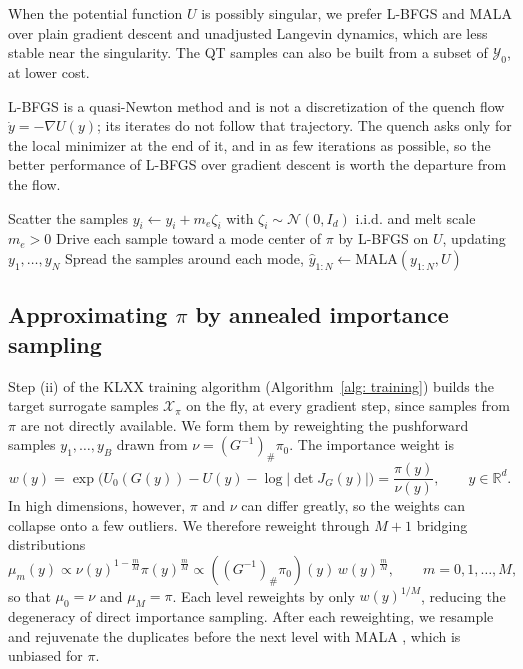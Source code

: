 \documentclass{article}
\begin{document}
When the potential function $U$ is possibly singular, we prefer L-BFGS and MALA over plain gradient descent and unadjusted Langevin dynamics, which are less stable near the singularity. The QT samples can also be built from a subset of $\mathcal Y_0$, at lower cost.

\begin{remark}
	{\color{blue}L-BFGS is a quasi-Newton method \citep{liu1989limited} and is not a discretization of the quench flow $\dot y = -\nabla U(y)$; its iterates do not follow that trajectory. The quench asks only for the local minimizer at the end of it, and in as few iterations as possible, so the better performance of L-BFGS over gradient descent is worth the departure from the flow.}
\end{remark}

\begin{algorithm}[htb]
\caption{Quench and temper (QT): wide-coverage construction}
\label{alg: QT}
Scatter the samples $y_i \gets y_i + m_e\zeta_i$ with $\zeta_i \sim \mathcal N(0, I_d)$ i.i.d. and melt scale $m_e > 0$\;
Drive each sample toward a mode center of $\pi$ by L-BFGS on $U$, updating $y_1,\dots,y_N$\;
Spread the samples around each mode, $\hat y_{1:N} \gets \mathrm{MALA}(y_{1:N}, U)$\;
\end{algorithm}

\subsection{Approximating $\pi$ by annealed importance sampling}
\label{subsec: annealing}

Step (ii) of the KLXX training algorithm (Algorithm~\ref{alg: training}) builds the target surrogate samples $\mathcal X_{\pi}$ on the fly, at every gradient step, since samples from $\pi$ are not directly available. We form them by reweighting the pushforward samples $y_1,\dots,y_B$ drawn from $\nu=(G^{-1})_{\#}\pi_0$. The importance weight is
\begin{equation}
	w(y)
	= \exp\Big( U_0(G(y)) - U(y) - \log|\det J_G(y)| \Big)
	= \frac{\pi(y)}{\nu(y)},
	\qquad y \in \mathbb R^d.
	\label{eq: weight}
\end{equation}
In high dimensions, however, $\pi$ and $\nu$ can differ greatly, so the weights can collapse onto a few outliers. We therefore reweight through $M+1$ bridging distributions
\begin{equation}
	\mu_m(y) \propto \nu(y)^{1-\frac{m}{M}} \pi(y)^{\frac{m}{M}} \propto ((G^{-1})_{\#}\pi_0)(y)\, w(y)^{\frac{m}{M}}, \qquad m = 0,1,\dots,M,
	\label{eq: mu-m}
\end{equation}
so that $\mu_0 = \nu$ and $\mu_M = \pi$. Each level reweights by only $w(y)^{1/M}$, reducing the degeneracy of direct importance sampling.
After each reweighting, we resample and rejuvenate the duplicates before the next level with MALA \citep{roberts1996exponential}, which is unbiased for $\pi$.
\end{document}
